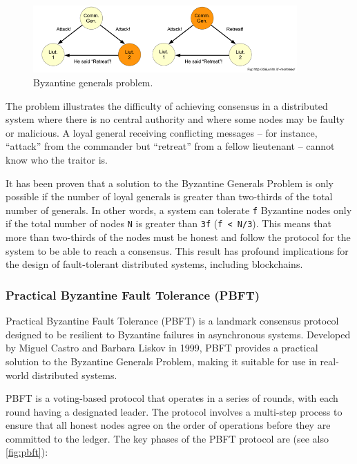 \begin{figure}[t]
	\begin{center}
		\includegraphics[width=0.9\textwidth]{./figs/byzantyne-generals.png}
		\caption{Byzantine generals problem.}		
		\label{fig:generals}
	\end{center}	
\end{figure}


The problem illustrates the difficulty of achieving consensus in a
distributed system where there is no central authority and where some
nodes may be faulty or malicious. A loyal general receiving conflicting
messages -- for instance, ``attack'' from the commander but ``retreat''
from a fellow lieutenant -- cannot know who the traitor is.

It has been proven that a solution to the Byzantine Generals Problem is
only possible if the number of loyal generals is greater than two-thirds
of the total number of generals. In other words, a system can tolerate
\texttt{f} Byzantine nodes only if the total number of nodes \texttt{N}
is greater than \texttt{3f} (\texttt{f\ \textless{}\ N/3}). This means
that more than two-thirds of the nodes must be honest and follow the
protocol for the system to be able to reach a consensus. This result has
profound implications for the design of fault-tolerant distributed
systems, including blockchains.

\subsubsection{Practical Byzantine Fault Tolerance
	(PBFT)}\label{practical-byzantine-fault-tolerance-pbft}

Practical Byzantine Fault Tolerance (PBFT)  is a landmark consensus
protocol designed to be resilient to Byzantine failures in asynchronous
systems. Developed by Miguel Castro and Barbara Liskov in 1999, PBFT
provides a practical solution to the Byzantine Generals Problem, making
it suitable for use in real-world distributed systems.

PBFT is a voting-based protocol that operates in a series of rounds,
with each round having a designated leader. The protocol involves a
multi-step process to ensure that all honest nodes agree on the order of
operations before they are committed to the ledger. The key phases of
the PBFT protocol are (see also \autoref{fig:pbft}):

